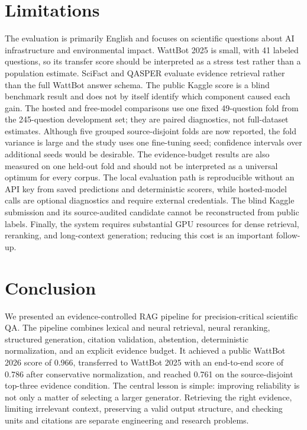 \documentclass[11pt]{article}
\begin{document}
\section{Limitations}
\label{sec:limitations}
The evaluation is primarily English and focuses on scientific questions about AI infrastructure and environmental impact. WattBot 2025 is small, with 41 labeled questions, so its transfer score should be interpreted as a stress test rather than a population estimate. SciFact and QASPER evaluate evidence retrieval rather than the full WattBot answer schema. The public Kaggle score is a blind benchmark result and does not by itself identify which component caused each gain. The hosted and free-model comparisons use one fixed 49-question fold from the 245-question development set; they are paired diagnostics, not full-dataset estimates. Although five grouped source-disjoint folds are now reported, the fold variance is large and the study uses one fine-tuning seed; confidence intervals over additional seeds would be desirable. The evidence-budget results are also measured on one held-out fold and should not be interpreted as a universal optimum for every corpus. The local evaluation path is reproducible without an API key from saved predictions and deterministic scorers, while hosted-model calls are optional diagnostics and require external credentials. The blind Kaggle submission and its source-audited candidate cannot be reconstructed from public labels. Finally, the system requires substantial GPU resources for dense retrieval, reranking, and long-context generation; reducing this cost is an important follow-up.

\section{Conclusion}
\label{sec:conclusion}
We presented an evidence-controlled RAG pipeline for precision-critical scientific QA. The pipeline combines lexical and neural retrieval, neural reranking, structured generation, citation validation, abstention, deterministic normalization, and an explicit evidence budget. It achieved a public WattBot 2026 score of 0.966, transferred to WattBot 2025 with an end-to-end score of 0.786 after conservative normalization, and reached 0.761 on the source-disjoint top-three evidence condition. The central lesson is simple: improving reliability is not only a matter of selecting a larger generator. Retrieving the right evidence, limiting irrelevant context, preserving a valid output structure, and checking units and citations are separate engineering and research problems.
\end{document}
